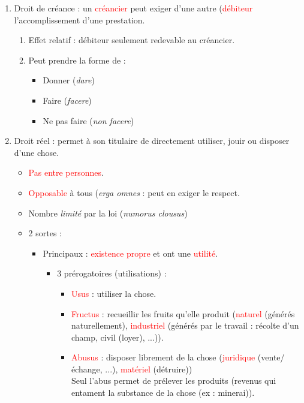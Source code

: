 \begin{enumerate}
	\item Droit de créance : un \textcolor{red}{créancier} peut exiger d'une autre (\textcolor{red}{débiteur} l'accomplissement d'une prestation.
	\begin{enumerate}
		\item Effet relatif : débiteur seulement redevable au créancier.
		\item Peut prendre la forme de :
		\begin{itemize}
			\item Donner (\textit{dare})
			\item Faire (\textit{facere})
			\item Ne pas faire (\textit{non facere})
		\end{itemize}
	\end{enumerate}
	\item Droit réel : permet à son titulaire de directement utiliser, jouir ou disposer d'une chose.
	\begin{itemize}
		\item \textcolor{red}{Pas entre personnes}.
	    \item \textcolor{red}{Opposable} à tous (\textit{erga omnes} : peut en exiger le respect.
	    \item Nombre \textit{limité} par la loi (\textit{numorus clousus})
	    \item 2 sortes :
	    \begin{itemize}
	    	    \item Principaux : \textcolor{red}{existence propre} et ont une \textcolor{red}{utilité}.
	    	    \begin{itemize}
	    	    	    \item 3 prérogatoires (utilisations) :
	    	    	    \begin{itemize}
	    	    	    	    \item \textcolor{red}{Usus} : utiliser la chose.
	    	    	    	    \item \textcolor{red}{Fructus} : recueillir les fruits qu'elle produit (\textcolor{red}{naturel} (générés naturellement), \textcolor{red}{industriel} (générés par le travail : récolte d'un champ, civil (loyer), ...)).
	    	    	    	    \item \textcolor{red}{Abusus} : disposer librement de la chose (\textcolor{red}{juridique} (vente/échange, ...), \textcolor{red}{matériel} (détruire))\\
	    	    	    	    \textcolor{red}{\warning} Seul l'abus permet de prélever les produits (revenus qui entament la substance de la chose (ex : minerai)).

\end{itemize}
\end{itemize}
\end{itemize}
\end{itemize}
\end{enumerate}
